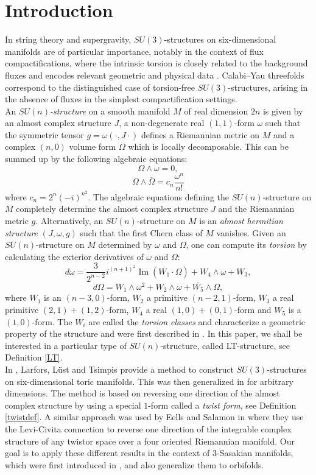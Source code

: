 \documentclass[12pt, reqno]{amsart}
\theoremstyle{definition}
\DeclareMathOperator\Ima{Im}
\begin{document}
\section{Introduction}
In string theory and supergravity,  $SU(3)$-structures on six-dimensional manifolds are of particular importance, notably in the context of flux compactifications, where the intrinsic torsion is closely related to the background fluxes and encodes relevant geometric and physical data \cite{Gra_a_2006}. Calabi–Yau threefolds correspond to the distinguished case of torsion-free $SU(3)$-structures, arising in the absence of fluxes in the simplest compactification settings.  \\ 
\indent An \textit{$SU(n)$-structure} on a smooth manifold $M$ of real dimension $2n$ is given by an almost complex structure $J$, a non-degenerate real $(1,1)$-form $\omega$ such that the symmetric tensor $g=\omega(\cdot,J\cdot)$ defines a Riemannian metric on $M$ and a complex $(n,0)$ volume form $\Omega$ which is locally decomposable. This can be summed up by the following algebraic equations:
$$\Omega\wedge\omega=0,$$ $$\Omega\wedge\overline{\Omega}=c_n\frac{\omega^n}{n!}$$ where $c_n=2^n(-i)^{n^2}$. The algebraic equations defining the $SU(n)$-structure on $M$ completely determine the almost complex structure $J$ and the Riemannian metric $g$. Alternatively, an $SU(n)$-structure on $M$ is an \textit{almost hermitian structure} $(J,\omega,g)$ such that the first Chern class of $M$ vanishes. Given an $SU(n)$-structure on $M$ determined by $\omega$ and $\Omega$, one can compute its \textit{torsion} by calculating the exterior derivatives of $\omega$ and $\Omega$:
$$d\omega=\frac{3}{2^{n-2}}i^{(n+1)^2}\Ima(\overline{W_1}\cdot\Omega)+W_4\wedge\omega+W_3,$$ $$d\Omega=W_1\wedge\omega^2+W_2\wedge\omega+\overline{W_5}\wedge\Omega,$$ where $W_1$ is an $(n-3,0)$-form, $W_2$ a primitive $(n-2,1)$-form, $W_3$ a real primitive $(2,1)+(1,2)$-form, $W_4$ a real $(1,0)+(0,1)$-form and $W_5$ is a $(1,0)$-form. The $W_i$ are called the \textit{torsion classes} and characterize a geometric property of the structure and were first described in \cite{Grayhervella}. In this paper, we shall be interested in a particular type of $SU(n)$-structure, called LT-structure, see Definition \ref{LT}.\\ 
\indent In \cite{Larfors_2010}, Larfors, Lüst and Tsimpis provide a method to construct $SU(3)$-structures on six-dimensional toric manifolds. This was then generalized in \cite{peres2026sunstructuresquotienttorusactions} for arbitrary dimensions. The method is based on reversing one direction of the almost complex structure by using a special $1$-form called a \textit{twist form}, see Definition \ref{twistdef}. A similar approach was used by Eells and Salamon in \cite{EellsSalamon} where they use the Levi-Civita connection to reverse one direction of the integrable complex structure of any twistor space over a four oriented Riemannian manifold.  Our goal is to apply these different results in the context of $3$-Sasakian manifolds,  which were first introduced in \cite{Kuo1970OnAC}, and also generalize them to orbifolds.
\end{document}

